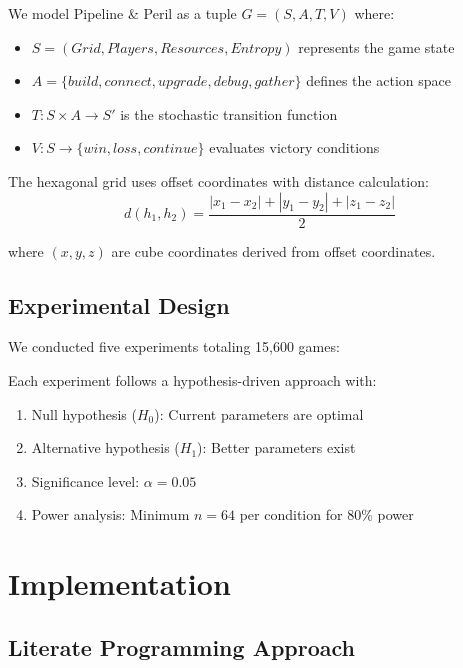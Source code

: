 \documentclass[sigconf]{acmart}
\begin{document}
We model Pipeline \& Peril as a tuple $G = (S, A, T, V)$ where:

\begin{itemize}
\item $S = (Grid, Players, Resources, Entropy)$ represents the game state
\item $A = \{build, connect, upgrade, debug, gather\}$ defines the action space
\item $T: S \times A \rightarrow S'$ is the stochastic transition function
\item $V: S \rightarrow \{win, loss, continue\}$ evaluates victory conditions
\end{itemize}

The hexagonal grid uses offset coordinates with distance calculation:
\begin{equation}
d(h_1, h_2) = \frac{|x_1 - x_2| + |y_1 - y_2| + |z_1 - z_2|}{2}
\end{equation}

where $(x, y, z)$ are cube coordinates derived from offset coordinates.

\subsection{Experimental Design}

We conducted five experiments totaling 15,600 games:



Each experiment follows a hypothesis-driven approach with:
\begin{enumerate}
\item Null hypothesis ($H_0$): Current parameters are optimal
\item Alternative hypothesis ($H_1$): Better parameters exist
\item Significance level: $\alpha = 0.05$
\item Power analysis: Minimum $n = 64$ per condition for 80\% power
\end{enumerate}

\section{Implementation}

\subsection{Literate Programming Approach}
\end{document}
